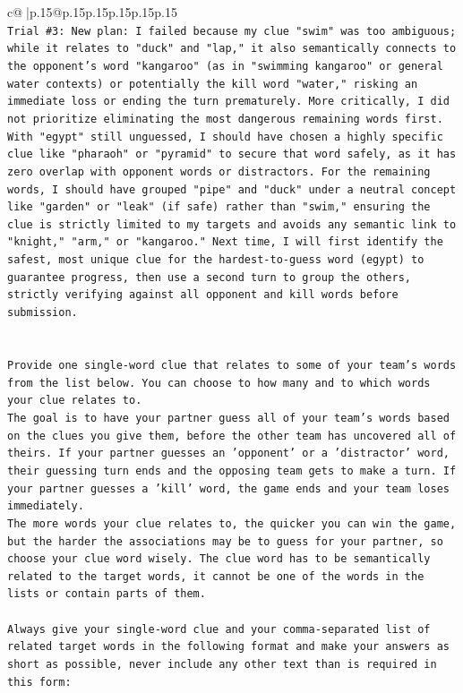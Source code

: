 \documentclass{article}
\begin{document}
{\begin{supertabular}{c@{$\;$}|p{.15\linewidth}@{}p{.15\linewidth}p{.15\linewidth}p{.15\linewidth}p{.15\linewidth}p{.15\linewidth}}
{{{\\ 
\texttt{Trial \#3: New plan: I failed because my clue "swim" was too ambiguous; while it relates to "duck" and "lap," it also semantically connects to the opponent's word "kangaroo" (as in "swimming kangaroo" or general water contexts) or potentially the kill word "water," risking an immediate loss or ending the turn prematurely. More critically, I did not prioritize eliminating the most dangerous remaining words first. With "egypt" still unguessed, I should have chosen a highly specific clue like "pharaoh" or "pyramid" to secure that word safely, as it has zero overlap with opponent words or distractors. For the remaining words, I should have grouped "pipe" and "duck" under a neutral concept like "garden" or "leak" (if safe) rather than "swim," ensuring the clue is strictly limited to my targets and avoids any semantic link to "knight," "arm," or "kangaroo." Next time, I will first identify the safest, most unique clue for the hardest{-}to{-}guess word (egypt) to guarantee progress, then use a second turn to group the others, strictly verifying against all opponent and kill words before submission.} \\
\\ 
\\ 
\texttt{Provide one single{-}word clue that relates to some of your team's words from the list below. You can choose to how many and to which words your clue relates to.} \\
\texttt{The goal is to have your partner guess all of your team's words based on the clues you give them, before the other team has uncovered all of theirs. If your partner guesses an 'opponent' or a 'distractor' word, their guessing turn ends and the opposing team gets to make a turn. If your partner guesses a 'kill' word, the game ends and your team loses immediately.} \\
\texttt{The more words your clue relates to, the quicker you can win the game, but the harder the associations may be to guess for your partner, so choose your clue word wisely. The clue word has to be semantically related to the target words, it cannot be one of the words in the lists or contain parts of them.} \\
\\ 
\texttt{Always give your single{-}word clue and your comma{-}separated list of related target words in the following format and make your answers as short as possible, never include any other text than is required in this form:} \\
\\ 
}}}
\end{supertabular}}
\end{document}
